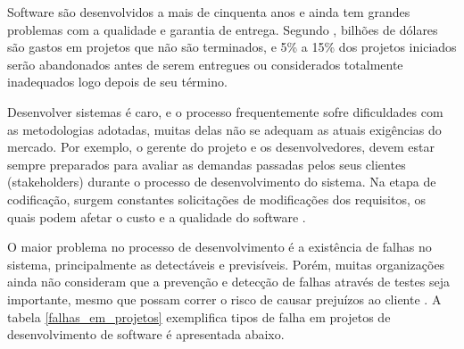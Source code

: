 Software são desenvolvidos a mais de cinquenta anos e ainda tem grandes problemas com a qualidade e garantia de entrega. Segundo , bilhões de dólares são gastos em projetos  que não são terminados, e 5\% a 15\% dos projetos iniciados serão abandonados antes de serem entregues ou considerados totalmente inadequados logo depois de seu término.

Desenvolver sistemas é caro, e o processo frequentemente sofre dificuldades com as metodologias adotadas, muitas delas não se adequam as atuais exigências do mercado. Por exemplo, o gerente do projeto e os desenvolvedores, devem estar sempre preparados para avaliar as demandas passadas pelos seus clientes (stakeholders) durante o processo de desenvolvimento do sistema. Na etapa de codificação, surgem constantes solicitações de modificações dos requisitos, os quais podem afetar o custo e a qualidade do software \cite{CERPA}.

O maior problema no processo de desenvolvimento é a existência de falhas no sistema, principalmente as detectáveis e previsíveis. Porém, muitas organizações ainda não consideram que a prevenção e detecção de falhas através de testes seja importante, mesmo que possam correr o risco de causar prejuízos ao cliente \cite{CHARETTE}. A tabela \ref{falhas_em_projetos} exemplifica tipos de falha em projetos de desenvolvimento de software é apresentada abaixo.

